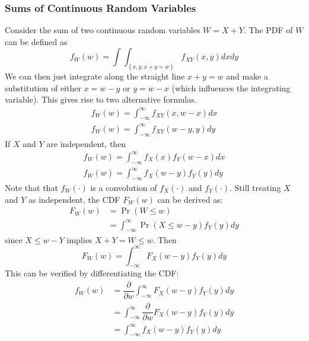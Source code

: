 \documentclass[11pt]{report} %
\begin{document}
\subsubsection{Sums of Continuous Random Variables}

Consider the sum of two continuous random variables $W = X + Y$. The PDF of $W$ can be defined as
\begin{equation}
f_{W}\left(w\right) = \int\int_{\left\{x,y: x + y = w\right\}}f_{XY}\left(x, y\right)dxdy
\end{equation}
We can then just integrate along the straight line $x + y = w$ and make a substitution of either $x = w - y$ or $y = w - x$ (which influences the integrating variable). This gives rise to two alternative formulas.
\begin{gather}
f_{W}\left(w\right) = \int_{-\infty}^{\infty}f_{XY}\left(x, w-x\right)dx \\
f_{W}\left(w\right) = \int_{-\infty}^{\infty}f_{XY}\left(w - y, y\right)dy
\end{gather}
If $X$ and $Y$ are independent, then
\begin{gather}
f_{W}\left(w\right) = \int_{-\infty}^{\infty}f_{X}\left(x\right)f_{Y}\left(w-x\right)dx \\
f_{W}\left(w\right) = \int_{-\infty}^{\infty}f_{X}\left(w - y\right)f_{Y}\left(y\right)dy
\end{gather}
Note that that $f_{W}\left(\cdot\right)$ is a convolution of $f_{X}\left(\cdot\right)$ and $f_{Y}\left(\cdot\right)$. Still treating $X$ and $Y$ as independent, the CDF $F_{W}\left(w\right)$ can be derived as:
\begin{align}
F_{W}\left(w\right) &= \operatorname{Pr}\left(W \leq w\right) \\
&= \int_{-\infty}^{\infty}\operatorname{Pr}\left(X \leq w - y\right)f_{Y}\left(y\right)dy
\end{align}
since $X \leq w - Y$ implies $X + Y = W \leq w$. Then
\begin{equation}
F_{W}\left(w\right) = \int_{-\infty}^{\infty}F_{X}\left(w - y\right)f_{Y}\left(y\right)dy
\end{equation}
This can be verified by differentiating the CDF:
\begin{align}
f_{W}\left(w\right) &= \dfrac{\partial}{\partial w}\int_{-\infty}^{\infty}F_{X}\left(w - y\right)f_{Y}\left(y\right)dy \\
&= \int_{-\infty}^{\infty}\dfrac{\partial}{\partial w}F_{X}\left(w - y\right)f_{Y}\left(y\right)dy \\
&= \int_{-\infty}^{\infty}f_{X}\left(w - y\right)f_{Y}\left(y\right)dy
\end{align}
\end{document}
